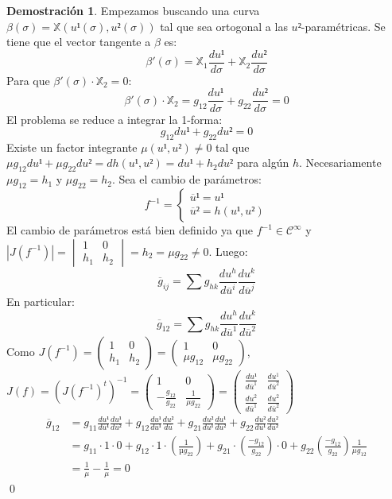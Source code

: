 \documentclass[twoside]{report}
\theoremstyle{definition}
\newtheorem*{dem}{Demostración}
\numberwithin{equation}{section}
\newcommand{\X}{\mathbb{X}}
\begin{document}
\begin{dem}
Empezamos buscando una curva $β(σ)=\X(u¹(σ),u²(σ))$ tal que sea ortogonal a las $u²$-paramétricas. Se tiene que el vector tangente a $β$ es:
\[ β'(σ) = \X_1 \frac{du¹}{dσ}+\X_2 \frac{du²}{dσ} \]
Para que $β'(σ) \cdot \X_2 = 0$:
\[ β'(σ) \cdot \X_2 = g_{12} \frac{du¹}{dσ} + g_{22} \frac{du²}{dσ} = 0 \]
El problema se reduce a integrar la 1-forma:
\[ g_{12} du¹ + g_{22} du² = 0 \]
Existe un factor integrante $μ(u¹,u²)\neq 0$ tal que $μ g_{12} du¹+μ g_{22} du² = dh(u¹,u²)= du¹+h_2 du²$ para algún $h$. Necesariamente $μ g_{12} = h_1$ y $μ g_{22} = h_2$. Sea el cambio de parámetros:
\[ f^{-1} = \begin{cases}
	\overline{u}¹ = u¹\\
	\overline{u}² = h(u¹,u²)
\end{cases}\]
El cambio de parámetros está bien definido ya que $f^{-1} \in \mathcal{C}^\infty$ y $|J(f^{-1})| = \begin{vmatrix}1 & 0\\h_1 & h_2\end{vmatrix} = h_2 = μ g_{22} \neq 0$. Luego:
\[ \overline{g}_{ij} = \sum g_{hk} \frac{du^h}{d\overline{u}^i} \frac{du^k}{d\overline{u}^j}\]
En particular:
\[ \overline{g}_{12} = \sum g_{hk} \frac{du^h}{d\overline{u}^1} \frac{du^k}{d\overline{u}^2} \]
Como $J(f^{-1}) = \begin{pmatrix}1 & 0\\h_1 & h_2\end{pmatrix} = \begin{pmatrix}1 & 0\\μ g_{12} & μ g_{22}\end{pmatrix}$, $J(f) = (J(f^{-1})^t)^{-1} = \begin{pmatrix}1 & 0 \\ -\frac{g_{12}}{g_{22}} & \frac{1}{μg_{22}}\end{pmatrix} = \begin{pmatrix}\frac{du¹}{d\overline{u}^1} & \frac{du^1}{d\overline{u}^2}\\\frac{du^2}{d\overline{u}^1} & \frac{du^2}{d\overline{u}^2}\end{pmatrix}$
\begin{align*}
	\overline{g}_{12} & = g_{11} \frac{du¹}{d\overline{u}¹} \frac{du¹}{d\overline{u}²} + g_{12} \frac{du¹}{d\overline{u}¹} \frac{du²}{d\overline{u}} + g_{21} \frac{du²}{d\overline{u}¹} \frac{du¹}{d\overline{u}²} + g_{22} \frac{du²}{d\overline{u}¹} \frac{du²}{d\overline{u}²} \\
	& = g_{11} \cdot 1 \cdot 0 + g_{12} \cdot 1 \cdot \left(\frac{1}{µ g_{22}}\right) + g_{21} \cdot \left( \frac{-g_{12}}{g_{22}}\right) \cdot 0  + g_{22} \left(\frac{-g_{12}}{g_{22}}\right) \frac{1}{μ g_{12}} \\
	& = \frac{1}{μ} - \frac{1}{μ} = 0
\end{align*}
\qed
\end{dem}
\end{document}
